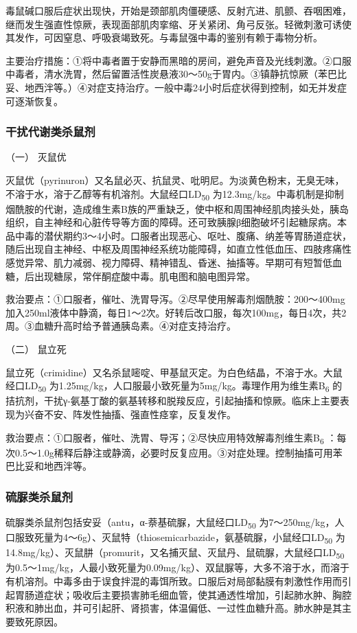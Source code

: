 毒鼠碱口服后症状出现快，开始是颈部肌肉僵硬感、反射亢进、肌颤、吞咽困难，继而发生强直性惊厥，表现面部肌肉挛缩、牙关紧闭、角弓反张。轻微刺激可诱使其发作，可因窒息、呼吸衰竭致死。与毒鼠强中毒的鉴别有赖于毒物分析。

主要治疗措施：①将中毒者置于安静而黑暗的房间，避免声音及光线刺激。②口服中毒者，清水洗胃，然后留置活性炭悬液30～50g于胃内。③镇静抗惊厥（苯巴比妥、地西泮等。）④对症支持治疗。一般中毒24小时后症状得到控制，如无并发症可逐渐恢复。

\subsubsection{干扰代谢类杀鼠剂}

\hypertarget{text00144.htmlux5cux23CHP5-3-6-4-1}{}
（一） 灭鼠优

灭鼠优（pyrinuron）又名鼠必灭、抗鼠灵、吡明尼。为淡黄色粉末，无臭无味，不溶于水，溶于乙醇等有机溶剂。大鼠经口LD\textsubscript{50}
为12.3mg/kg。中毒机制是抑制烟酰胺的代谢，造成维生素B族的严重缺乏，使中枢和周围神经肌肉接头处，胰岛组织，自主神经和心脏传导等方面的障碍。还可致胰腺β细胞破坏引起糖尿病。本品中毒的潜伏期约3～4小时。口服者出现恶心、呕吐、腹痛、纳差等胃肠道症状，随后出现自主神经、中枢及周围神经系统功能障碍，如直立性低血压、四肢疼痛性感觉异常、肌力减弱、视力障碍、精神错乱、昏迷、抽搐等。早期可有短暂低血糖，后出现糖尿，常伴酮症酸中毒。肌电图和脑电图异常。

救治要点：①口服者，催吐、洗胃导泻。②尽早使用解毒剂烟酰胺：200～400mg加入250ml液体中静滴，每日1～2次。好转后改口服，每次100mg，每日4次，共2周。③血糖升高时给予普通胰岛素。④对症支持治疗。

\hypertarget{text00144.htmlux5cux23CHP5-3-6-4-2}{}
（二） 鼠立死

鼠立死（crimidine）又名杀鼠嘧啶、甲基鼠灭定。为白色结晶，不溶于水。大鼠经口LD\textsubscript{50}
为1.25mg/kg，人口服最小致死量为5mg/kg。毒理作用为维生素B\textsubscript{6}
的拮抗剂，干扰γ-氨基丁酸的氨基转移和脱羧反应，引起抽搐和惊厥。临床上主要表现为兴奋不安、阵发性抽搐、强直性痉挛，反复发作。

救治要点：①口服者，催吐、洗胃、导泻；②尽快应用特效解毒剂维生素B\textsubscript{6}
：每次0.5～1.0g稀释后静注或静滴，必要时反复应用。③对症处理。控制抽搐可用苯巴比妥和地西泮等。

\subsubsection{硫脲类杀鼠剂}

硫脲类杀鼠剂包括安妥（antu，α-萘基硫脲，大鼠经口LD\textsubscript{50}
为7～250mg/kg，人口服致死量为4～6g）、灭鼠特（thiosemicarbazide，氨基硫脲，小鼠经口LD\textsubscript{50}
为14.8mg/kg）、灭鼠肼（promurit，又名捕灭鼠、灭鼠丹、鼠硫脲，大鼠经口LD\textsubscript{50}
为0.5～1mg/kg，人最小致死量为0.09mg/kg）、双鼠脲等，大多不溶于水，而溶于有机溶剂。中毒多由于误食拌混的毒饵所致。口服后对局部黏膜有刺激性作用而引起胃肠道症状；吸收后主要损害肺毛细血管，使其通透性增加，引起肺水肿、胸腔积液和肺出血，并可引起肝、肾损害，体温偏低、一过性血糖升高。肺水肿是其主要致死原因。

